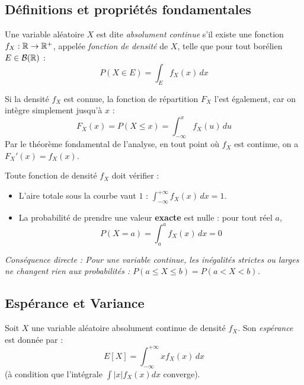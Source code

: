 \subsection{Définitions et propriétés fondamentales}

\begin{definition}
    Une variable aléatoire $X$ est dite \emph{absolument continue} s'il existe une fonction $f_X : \mathbb{R} \to \mathbb{R}^+$, appelée \emph{fonction de densité} de $X$, telle que pour tout borélien $E \in \mathcal{B}(\mathbb{R})$ :
    \[
    P(X \in E) = \int_E f_X(x) \, dx
    \]
\end{definition}

\begin{remarque}
    Si la densité $f_X$ est connue, la fonction de répartition $F_X$ l'est également, car on intègre simplement jusqu'à $x$ :
    \[
    F_X(x) = P(X \leq x) = \int_{-\infty}^{x} f_X(u) \, du
    \]
    Par le théorème fondamental de l'analyse, en tout point où $f_X$ est continue, on a $F_X'(x) = f_X(x)$.
\end{remarque}

\begin{proposition}
    Toute fonction de densité $f_X$ doit vérifier :
    \begin{itemize}
        \item L'aire totale sous la courbe vaut $1$ : $\displaystyle\int_{-\infty}^{+\infty} f_X(x) \, dx = 1$.
        \item La probabilité de prendre une valeur \textbf{exacte} est nulle : pour tout réel $a$, 
        \[
        P(X = a) = \int_{a}^{a} f_X(x) \, dx = 0
        \]
    \end{itemize}
\end{proposition}
\textit{Conséquence directe : Pour une variable continue, les inégalités strictes ou larges ne changent rien aux probabilités : $P(a \le X \le b) = P(a < X < b)$.}

\subsection{Espérance et Variance}

\begin{definition}
    Soit $X$ une variable aléatoire absolument continue de densité $f_X$. Son \emph{espérance} est donnée par :
    \[
    E[X] = \int_{-\infty}^{+\infty} x f_X(x) \, dx
    \]
    (à condition que l'intégrale $\int |x|f_X(x)dx$ converge).
\end{definition}

